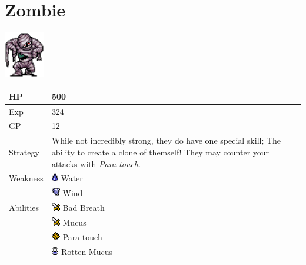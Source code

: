 \section{Zombie}
\label{monster:zombie}

\includegraphics[height=2cm,keepaspectratio]{./resources/monster/zombie}

\begin{longtable}{ l p{9cm} }
	HP
	& 500
\\ \hline
	Exp
	& 324
\\ \hline
	GP
	& 12
\\ \hline
	Strategy
	& While not incredibly strong, they do have one special skill; The ability to create a clone of themself! They may counter your attacks with \textit{Para-touch}.
\\ \hline
	Weakness
	& \includegraphics[height=1em,keepaspectratio]{./resources/effects/water} Water \\
	& \includegraphics[height=1em,keepaspectratio]{./resources/effects/wind} Wind
\\ \hline
	Abilities
	& \includegraphics[height=1em,keepaspectratio]{./resources/effects/damage} Bad Breath \\
	& \includegraphics[height=1em,keepaspectratio]{./resources/effects/damage} Mucus \\
	& \includegraphics[height=1em,keepaspectratio]{./resources/effects/paralyze} Para-touch \\
	& \includegraphics[height=1em,keepaspectratio]{./resources/effects/poison} Rotten Mucus
\end{longtable}
